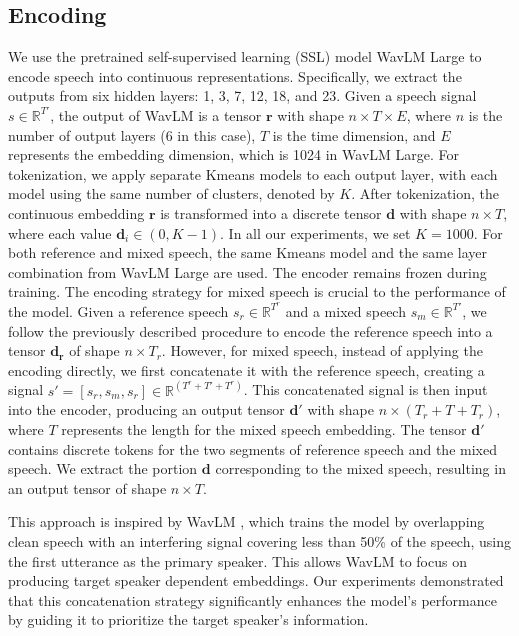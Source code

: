 \documentclass[conference]{IEEEtran}
\begin{document}
\subsection{Encoding}




We use the pretrained self-supervised learning (SSL) model WavLM Large \cite{wavlm} to encode speech into continuous representations. Specifically, we extract the outputs from six hidden layers: 1, 3, 7, 12, 18, and 23. Given a speech signal \(s \in \mathbb{R}^{T'}\), the output of WavLM is a tensor \(\bm{r}\) with shape \(n \times T \times E\), where \(n\) is the number of output layers (6 in this case), \(T\) is the time dimension, and \(E\) represents the embedding dimension, which is 1024 in WavLM Large.  For tokenization, we apply separate Kmeans models to each output layer, with each model using the same number of clusters, denoted by \(K\). After tokenization, the continuous embedding \(\bm{r}\) is transformed into a discrete tensor \(\bm{d}\) with shape \(n \times T\), where each value \(\bm{d}_{i} \in (0, K-1) \). In all our experiments, we set \(K = 1000\). For both reference and mixed speech, the same Kmeans model and the same layer combination from WavLM Large are used. The encoder remains frozen during training.
The encoding strategy for mixed speech is crucial to the performance of the model. Given a reference speech \(s_r \in \mathbb{R}^{T^r}\) and a mixed speech \(s_m \in \mathbb{R}^{T'}\), we follow the previously described procedure to encode the reference speech into a tensor \(\bm{d_r}\) of shape \(n \times T_r\). However, for mixed speech, instead of applying the encoding directly, we first concatenate it with the reference speech, creating a signal \(s' = [s_r, s_m, s_r] \in \mathbb{R}^{(T^r + T' + T^r)}\). This concatenated signal is then input into the encoder, producing an output tensor \(\bm{d'}\) with shape \(n \times (T_r + T + T_r)\), where \(T\) represents the length for the mixed speech embedding. The tensor \(\bm{d'}\) contains discrete tokens for the two segments of reference speech and the mixed speech. We extract the portion \(\bm{d}\) corresponding to the mixed speech, resulting in an output tensor of shape \(n \times T\).

This approach is inspired by WavLM \cite{wavlm}, which trains the model by overlapping clean speech with an interfering signal covering less than 50\% of the speech, using the first utterance as the primary speaker. This allows WavLM to focus on producing target speaker dependent embeddings. Our experiments demonstrated that this concatenation strategy significantly enhances the model's performance by guiding it to prioritize the target speaker's information.
\end{document}
